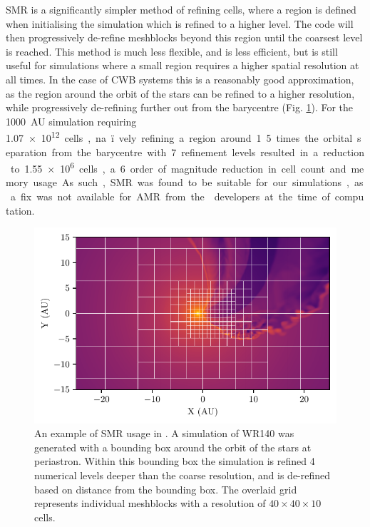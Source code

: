 SMR is a significantly simpler method of refining cells, where a region is defined when initialising the simulation which is refined to a higher level.
The code will then progressively de-refine meshblocks beyond this region until the coarsest level is reached.
This method is much less flexible, and is less efficient, but is still useful for simulations where a small region requires a higher spatial resolution at all times. 
In the case of CWB systems this is a reasonably good approximation, as the region around the orbit of the stars can be refined to a higher resolution, while progressively de-refining further out from the barycentre (Fig. \ref{fig:smr-example}).
For the \SI{1000}{AU} simulation requiring \SI{1.07e12} cells, na\"ively refining a region around 1.5 times the orbital separation from the barycentre with 7 refinement levels resulted in a reduction to \num{1.55e6} cells, a 6 order of magnitude reduction in cell count and memory usage.
As such, SMR was found to be suitable for our simulations, as a fix was not available for AMR from the \athena{} developers at the time of computation.

\begin{figure}[ht]
  \centering
  \includegraphics{assets/refinement/wr140/gridref.pdf}
  \caption[Static mesh refinement in \athena]{An example of SMR usage in \athena. A simulation of WR140 was generated with a bounding box around the orbit of the stars at periastron. Within this bounding box the simulation is refined 4 numerical levels deeper than the coarse resolution, and is de-refined based on distance from the bounding box. The overlaid grid represents individual meshblocks with a resolution of $40\times 40 \times 10$ cells.}
  \label{fig:smr-example}
\end{figure}

